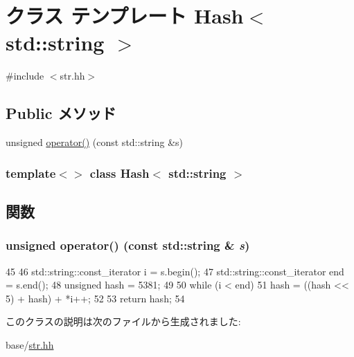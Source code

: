 \hypertarget{classHash_3_01std_1_1string_01_4}{
\section{クラス テンプレート Hash$<$ std::string $>$}
\label{classHash_3_01std_1_1string_01_4}
}


{\ttfamily \#include $<$str.hh$>$}\subsection*{Public メソッド}
\begin{DoxyCompactItemize}
\item 
unsigned \hyperlink{classHash_3_01std_1_1string_01_4_ae8a4d5cf9e10f37edbbbf86af387f7e5}{operator()} (const std::string \&s)
\end{DoxyCompactItemize}
\subsubsection*{template$<$$>$ class Hash$<$ std::string $>$}



\subsection{関数}
\hypertarget{classHash_3_01std_1_1string_01_4_ae8a4d5cf9e10f37edbbbf86af387f7e5}{
\subsubsection[{operator()}]{\setlength{\rightskip}{0pt plus 5cm}unsigned operator() (const std::string \& {\em s})}}
\label{classHash_3_01std_1_1string_01_4_ae8a4d5cf9e10f37edbbbf86af387f7e5}



\begin{DoxyCode}
45                                           {
46       std::string::const_iterator i = s.begin();
47       std::string::const_iterator end = s.end();
48       unsigned hash = 5381;
49 
50       while (i < end)
51           hash = ((hash << 5) + hash) + *i++;
52 
53       return hash;
54   }
\end{DoxyCode}


このクラスの説明は次のファイルから生成されました:\begin{DoxyCompactItemize}
\item 
base/\hyperlink{str_8hh}{str.hh}\end{DoxyCompactItemize}
